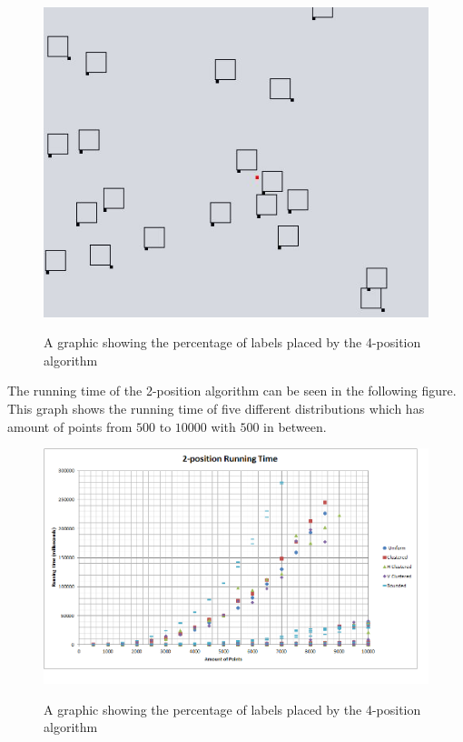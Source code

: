 \documentclass[crop=false,a4paper,oneside,11pt]{standalone}
\begin{document}
\begin{figure}[h!]
\centering
  \includegraphics[scale = 0.5]{2pos_example.JPG}\\
  \caption{A graphic showing the percentage of labels placed by the 4-position algorithm}
 \end{figure}

The running time of the 2-position algorithm can be seen in the following figure. This graph shows the running time of five different distributions which has amount of points from $500$ to $10000$ with $500$ in between.
\begin{figure}[h!]
 \centering
  \includegraphics[scale = 0.5]{2PosRunningTime.png}\\
  \caption{A graphic showing the percentage of labels placed by the 4-position algorithm}
 \end{figure}  
\end{document}
